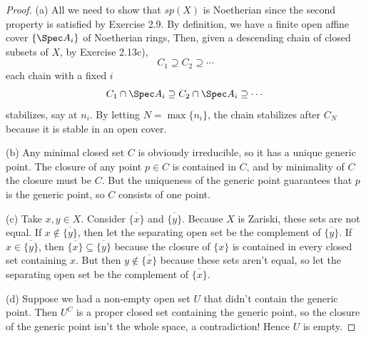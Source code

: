 \begin{proof}
	(a) All we need to show that $sp(X) $ is Noetherian since the second property is satisfied by Exercise 2.9.
	By definition, we have a finite open affine cover $\{\Spec A_i\} $ of Noetherian rings,
	Then, given a descending chain of closed subsets of $X $, by Exercise 2.13c),
	\[
		C_{1} \supseteq C_{2} \supseteq \cdots
	\]
	each chain with a fixed $i $
	\[
		C_{1}\cap \Spec A_i \supseteq C_{2}\cap \Spec A_i \supseteq \cdots
	\]
	stabilizes, say at $n_i $.
	By letting $N = \max \{n_i\} $, the chain stabilizes after $C_N $ because it is stable in an open cover.

	(b) Any minimal closed set $C $ is obviously irreducible, so it has a unique generic point.
	The closure of any point $p \in C $ is contained in $C $, and by minimality of $C $ the closure must be $C $.
	But the uniqueness of the generic point guarantees that $p $ is the generic point, so $C $ consists of one point.

	(c) Take $x,y \in X $.
	Consider $\overline{\{x\}  }$ and  $\overline{\{y\}  }  $.
	Because $X $ is Zariski, these sets are not equal.
	If $x\notin \overline{\{y\}  }  $, then let the separating open set be the complement of $\overline{\{y\}  } $.
	If $x \in \overline{\{y\}  }  $, then $\overline{\{x\}  } \subseteq \overline{\{y\}  }$ because the closure of $\{x\}   $ is contained in every closed set containing $x $.
	But then $y\notin \overline{\{x\}  }  $ because these sets aren't equal, so let the separating open set be the complement of $\overline{\{x\}  }  $.

	(d) Suppose we had a non-empty open set $U $ that didn't contain the generic point.
	Then $U^C $ is a proper closed set containing the generic point, so the closure of the generic point isn't the whole space, a contradiction!
	Hence $U $ is empty.


\end{proof}
